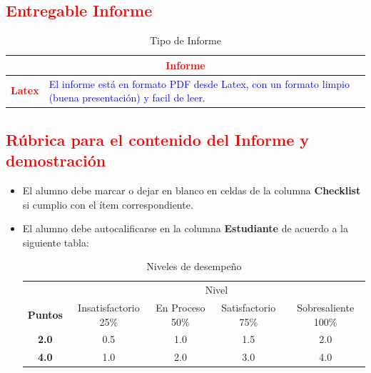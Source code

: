 \documentclass{article}
\begin{document}
	\subsection{\textcolor{red}{Entregable Informe}}
	\begin{table}[H]
		\caption{Tipo de Informe}
		\setlength{\tabcolsep}{0.5em} %
		{\renewcommand{\arraystretch}{1.5}%
		\begin{tabular}{|p{3cm}|p{12cm}|}
			\hline
			\multicolumn{2}{|c|}{\textbf{\textcolor{red}{Informe}}}  \\
			\hline 
			\textbf{\textcolor{red}{Latex}} & \textcolor{blue}{El informe está en formato PDF desde Latex,  con un formato limpio (buena presentación) y facil de leer.}   \\ 
			\hline 
			
			
		\end{tabular}
	}
	\end{table}
	
	\clearpage
	
	\subsection{\textcolor{red}{Rúbrica para el contenido del Informe y demostración}}
	\begin{itemize}			
		\item El alumno debe marcar o dejar en blanco en celdas de la columna \textbf{Checklist} si cumplio con el ítem correspondiente.
		\item El alumno debe autocalificarse en la columna \textbf{Estudiante} de acuerdo a la siguiente tabla:
	
		\begin{table}[ht]
			\caption{Niveles de desempeño}
			\begin{center}
			\begin{tabular}{ccccc}
    			\hline
    			 & \multicolumn{4}{c}{Nivel}\\
    			\cline{1-5}
    			\textbf{Puntos} & Insatisfactorio 25\%& En Proceso 50\% & Satisfactorio 75\% & Sobresaliente 100\%\\
    			\textbf{2.0}&0.5&1.0&1.5&2.0\\
    			\textbf{4.0}&1.0&2.0&3.0&4.0\\
    		\hline
			\end{tabular}
		\end{center}
	\end{table}	
	
	\end{itemize}
	
\end{document}
